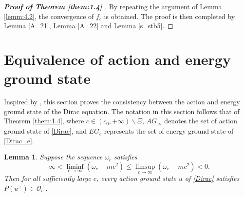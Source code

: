\documentclass{amsart}
\theoremstyle{plain}
\newtheorem{lemma}[theorem]{Lemma}
\theoremstyle{definition}
\theoremstyle{remark}
\numberwithin{equation}{section} \numberwithin{figure}{section}
\begin{document}
\begin{proof}[\textbf{Proof of Theorem \ref{them:1.4} } ]
  By repeating the argument of Lemma \ref{lemm:4.2}, the convergence of $f_c$ is obtained. The proof is then completed by Lemma \ref{A_21}, Lemma \ref{A_22} and Lemma \ref{s_stb5}.
\end{proof}

\section{Equivalence of action and energy ground state}\label{section6}
Inspired by \cite[Theorem 1.3]{DST23}, this section proves the consistency 
between the action and  energy ground 
state of the Dirac equation. The notation in this section 
follows that of Theorem \ref{them:1.4}, where \( c \in (c_0,+\infty)\backslash \Xi \), \( AG_{\omega_c} \) 
denotes the set of action ground state of \eqref{Dirac},
 and \( EG_c \) represents the set of energy ground state of \eqref{Dirac_e}.
 \begin{lemma}\label{new_p}
  Suppose the sequence $\omega_c$ satisfies
  $$
  -\infty < \liminf_{c \to \infty} (\omega_c - m c^2) \leq \limsup_{c \to \infty} (\omega_c - m c^2) < 0.
  $$
  Then for all sufficiently large $c$, every action ground state $u$ of \eqref{Dirac} satisfies $P(u^+) \in \mathcal{O}_c^+$.
\end{lemma}
\end{document}
